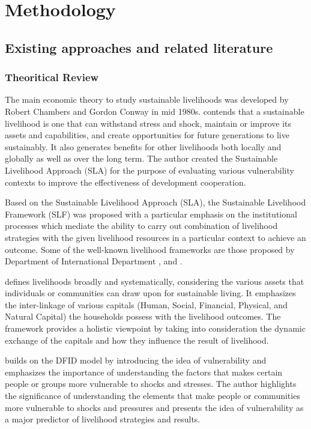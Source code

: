 \section{Methodology} \label{isect2}
\subsection{Existing approaches and related literature}
\subsubsection{Theoritical Review}
The main economic theory to study sustainable livelihoods was developed by Robert Chambers and Gordon Conway in mid 1980s. \cite{chambers1992sustainable} contends that a sustainable livelihood is one that can withstand stress and shock, maintain or improve its assets and capabilities, and create opportunities for future generations to live sustainably. It also generates benefits for other livelihoods both locally and globally as well as over the long term. The author created the Sustainable Livelihood Approach (SLA) for the purpose of evaluating various vulnerability contexts to improve the effectiveness of development cooperation.\par

Based on the Sustainable Livelihood Approach (SLA), the Sustainable Livelihood Framework (SLF) was proposed with a particular emphasis on the institutional processes which mediate the ability to carry out combination of livelihood strategies with the given livelihood resources in a particular context to achieve an outcome. Some of the well-known livelihood frameworks are those proposed by Department of International Department \cite{dfid1999sustainable}, \cite{ellis1999rural} and \cite{scoones2013livelihoods}.\par

\cite{dfid1999sustainable} defines livelihoods broadly and systematically, considering the various assets that individuals or communities can draw upon for sustainable living. It emphasizes the inter-linkage of various capitals (Human, Social, Financial, Physical, and Natural Capital) the households possess with the livelihood outcomes. The framework provides a holistic viewpoint by taking into consideration the dynamic exchange of the capitals and how they influence the result of livelihood.\par

\cite{ellis1999rural}  builds on the DFID model by introducing the idea of vulnerability and emphasizes the importance of understanding the factors that makes certain people or groups more vulnerable to shocks and stresses. The author highlights the significance of understanding the elements that make people or communities more vulnerable to shocks and pressures and presents the idea of vulnerability as a major predictor of livelihood strategies and results.\par


